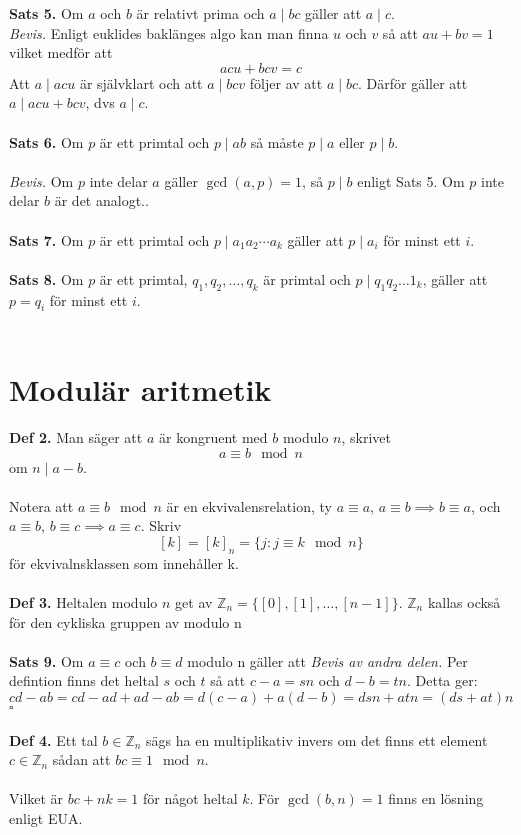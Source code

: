 \textbf{Sats 5.} Om $a$ och $b$ är relativt prima och $a \mid bc$ gäller att $a\mid c$.\\
\textit{Bevis.} Enligt euklides baklänges algo kan man finna $u$ och $v$ så att $au+bv=1$ vilket medför att $$acu+bcv=c$$
Att $a\mid acu$ är självklart och att $a \mid bcv$ följer av att $a\mid bc$. Därför gäller att $a\mid acu + bcv$, dvs $a\mid c$.
\\\\
\textbf{Sats 6.} Om $p$ är ett primtal och $p\mid ab$ så måste $p\mid a$ eller $p\mid b$.\\\\
\textit{Bevis.} Om $p$ inte delar $a$ gäller $\gcd(a,p) =1$, så $p\mid b$ enligt Sats 5. Om $p$ inte delar $b$ är det analogt..
\\\\
\textbf{Sats 7.} Om $p$ är ett primtal och $p\mid a_1a_2\cdots a_k$ gäller att $p\mid a_i$ för minst ett $i$.
\\\\
\textbf{Sats 8.} Om $p$ är ett primtal, $q_1,q_2,\ldots,q_k$ är primtal och $p\mid q_1q_2\ldots1_k$, gäller att $p=q_i$ för minst ett $i$.\\\\


\section{Modulär aritmetik}
\textbf{Def 2.} Man säger att $a$ är kongruent med $b$ modulo $n$, skrivet
 $$a\equiv b \mod n$$
 om $n\mid a-b$.
\\\\
Notera att $a\equiv b \mod n$ är en ekvivalensrelation, ty $a\equiv a$, $a\equiv b \implies b\equiv a$, och $a\equiv b$, $b\equiv c \implies a\equiv c$. Skriv 
$$[k]=[k]_n=\{j:j\equiv k \mod n\}$$
för ekvivalnsklassen som innehåller k.\\\\
\textbf{Def 3.} Heltalen modulo $n$ get av $\mathbb{Z}_n=\{[0],[1],\ldots,[n-1]\}$.
$\mathbb{Z}_n$ kallas också för den cykliska gruppen av modulo n\\\\
\textbf{Sats 9.} Om $a\equiv c$ och $b\equiv d$ modulo n gäller att
\textit{Bevis av andra delen.} Per defintion finns det heltal $s$ och $t$ så att $c-a=sn$ och $d-b=tn$. Detta ger:
$$cd-ab=cd-ad+ad-ab=d(c-a)+a(d-b)=dsn+atn=(ds+at)n$$
$\square$
\\\\
\textbf{Def 4.} Ett tal $b\in \mathbb{Z}_n$ sägs ha en multiplikativ invers om det finns ett element $c\in \mathbb{Z}_n$ sådan att $bc\equiv 1\mod n$. \\\\
Vilket är $bc+nk=1$ för något heltal $k$. För $\gcd(b,n)=1$ finns en lösning enligt EUA.